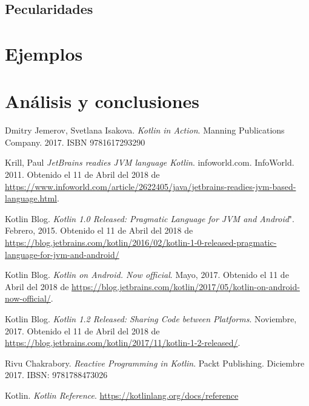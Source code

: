 \subsection{Pecularidades}

\section{Ejemplos}

\section{Análisis y conclusiones}


\begin{thebibliography}{9}

 Dmitry Jemerov, Svetlana Isakova. \emph{Kotlin in Action}. Manning Publications Company. 2017. ISBN 9781617293290

 Krill, Paul \emph{JetBrains readies JVM language Kotlin}. infoworld.com. InfoWorld. 2011. Obtenido el 11 de Abril del 2018 de \url{https://www.infoworld.com/article/2622405/java/jetbrains-readies-jvm-based-language.html}.

 Kotlin Blog. \emph{Kotlin 1.0 Released: Pragmatic Language for JVM and Android}". Febrero, 2015. Obtenido el 11 de Abril del 2018 de \url{https://blog.jetbrains.com/kotlin/2016/02/kotlin-1-0-released-pragmatic-language-for-jvm-and-android/}

 Kotlin Blog. \emph{Kotlin on Android. Now official}. Mayo, 2017. Obtenido el 11 de Abril del 2018 de \url{https://blog.jetbrains.com/kotlin/2017/05/kotlin-on-android-now-official/}.

 Kotlin Blog. \emph{Kotlin 1.2 Released: Sharing Code between Platforms}. Noviembre, 2017. Obtenido el 11 de Abril del 2018 de \url{https://blog.jetbrains.com/kotlin/2017/11/kotlin-1-2-released/}.

 Rivu Chakrabory. \emph{Reactive Programming in Kotlin}. Packt Publishing. Diciembre 2017. IBSN: 9781788473026

 Kotlin. \emph{Kotlin Reference}. \url{https://kotlinlang.org/docs/reference}

\end{thebibliography}



